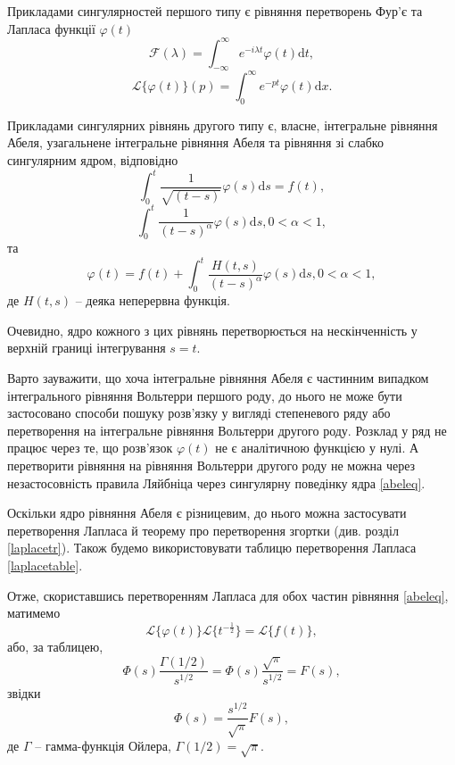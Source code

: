 \documentclass[14pt,twoside]{extreport}
\theoremstyle{mystyle}
\numberwithin{equation}{chapter}
\begin{document}
Прикладами сингулярностей першого типу є рівняння перетворень Фур'є та Лапласа функції $\varphi(t)$
\begin{equation}
	\mathcal{F}(\lambda)=\int_{-\infty}^{\infty}e^{-i\lambda t}\varphi(t)\mathrm{d}t,
\end{equation}
\begin{equation}	
    \mathcal{L}\{\varphi(t)\}(p)=\int_{0}^{\infty}e^{-pt}\varphi(t)\mathrm{d}x.
\end{equation}

Прикладами сингулярних рівнянь другого типу є, власне, інтегральне рівняння Абеля, узагальнене інтегральне рівняння Абеля та рівняння зі слабко сингулярним ядром, відповідно
\begin{equation}\label{abeleq}
	\int_{0}^{t}\frac{1}{\sqrt{(t-s)}}\varphi(s)\mathrm{d}s = f(t),
\end{equation}
\begin{equation}	
	\int_{0}^{t}\frac{1}{(t-s)^{\alpha}}\varphi(s)\mathrm{d}s, 0<\alpha<1,
\end{equation}
та
\begin{equation}
	\varphi(t)=f(t)+\displaystyle \int_{0}^{t}\frac{H(t, s)}{(t-s)^{\alpha}}\varphi(s)\mathrm{d}s, 0<\alpha<1,
\end{equation}
де $H(t,s)$ -- деяка неперервна функція.

Очевидно, ядро кожного з цих рівнянь перетворюється на нескінченність у верхній границі інтегрування $s=t$.

Варто зауважити, що хоча інтегральне рівняння Абеля є частинним випадком інтегрального рівняння Вольтерри першого роду, до нього не може бути застосовано способи пошуку розв'язку у вигляді степеневого ряду або перетворення на інтегральне рівняння Вольтерри другого роду. Розклад у ряд не працює через те, що розв'язок $\varphi(t)$ не є аналітичною функцією у нулі. А перетворити рівняння на рівняння Вольтерри другого роду не можна через незастосовність правила Ляйбніца через сингулярну поведінку ядра \eqref{abeleq}.

Оскільки ядро рівняння Абеля є різницевим, до нього можна застосувати перетворення Лапласа й теорему про перетворення згортки (див. розділ \ref{laplacetr}). Також будемо використовувати таблицю перетворення Лапласа \ref{laplacetable}.

Отже, скориставшись перетворенням Лапласа для обох частин рівняння \eqref{abeleq}, матимемо
\begin{equation}
	\mathcal{L}\{\varphi(t)\}\mathcal{L}\{t^{-\frac{1}{2}}\}=\mathcal{L}\{f(t)\},
\end{equation}
або, за таблицею,
\begin{equation}
\Phi(s)\displaystyle \frac{\Gamma(1/2)}{s^{1/2}}=\Phi(s)\frac{\sqrt{\pi}}{s^{1/2}}=F(s),
\end{equation}
звідки
\begin{equation}\label{abeltransit}
	\Phi(s)=\displaystyle \frac{s^{1/2}}{\sqrt{\pi}}F(s),
\end{equation}
де $\Gamma$ -- гамма-функція Ойлера, $\Gamma(1/2)=\sqrt{\pi}$.
\end{document}
